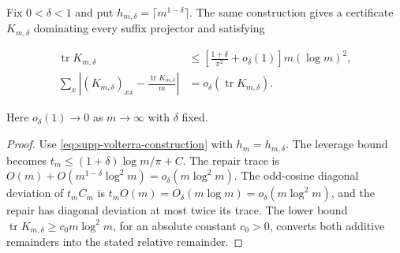 \begin{corollary}
\label{cor:supp-fixed-delta-volterra}
Fix \(0<\delta<1\) and put
\(h_{m,\delta}=\lceil m^{1-\delta}\rceil\).  The same construction gives
a certificate \(K_{m,\delta}\) dominating every suffix projector and
satisfying

\begin{align}
 \operatorname{tr}K_{m,\delta}
 &\le\left[\frac{1+\delta}{\pi^2}+o_\delta(1)\right]
 m(\log m)^2,
 \label{eq:supp-fixed-delta-trace}\\
 \sum_x\left|(K_{m,\delta})_{xx}
 -\frac{\operatorname{tr}K_{m,\delta}}m\right|
 &=o_\delta(\operatorname{tr}K_{m,\delta}).
 \label{eq:supp-fixed-delta-flatness}
\end{align}

Here \(o_\delta(1)\to0\) as \(m\to\infty\) with \(\delta\) fixed.
\end{corollary}

\begin{proof}
Use \eqref{eq:supp-volterra-construction} with
\(h_m=h_{m,\delta}\).  The leverage bound becomes
\(t_m\le(1+\delta)\log m/\pi+C\).  The repair trace is
\(O(m)+O(m^{1-\delta}\log^2m)=o_\delta(m\log^2m)\).  The odd-cosine
diagonal deviation of \(t_mC_m\) is
\(t_mO(m)=O_\delta(m\log m)=o_\delta(m\log^2m)\), and the repair has
diagonal deviation at most twice its trace.  The lower bound
\(\operatorname{tr}K_{m,\delta}\ge c_0m\log^2m\), for an absolute constant
\(c_0>0\), converts both additive remainders into the stated relative
remainder.
\end{proof}

